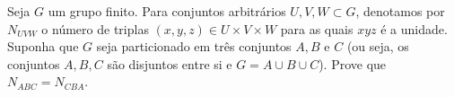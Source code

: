 Seja \( G\) um grupo finito. Para conjuntos arbitrários \( U, V, W \subset G\), denotamos por \( N_{UVW}\) o número de triplas \( (x, y, z) \in U \times V \times W\) para as quais \( xyz\) é a unidade. Suponha que \( G\) seja particionado em três conjuntos \( A, B\) e \( C\) (ou seja, os conjuntos \( A, B, C\) são disjuntos entre si e \( G = A \cup B \cup C\)). Prove que \( N_{ABC}= N_{CBA}.\)
